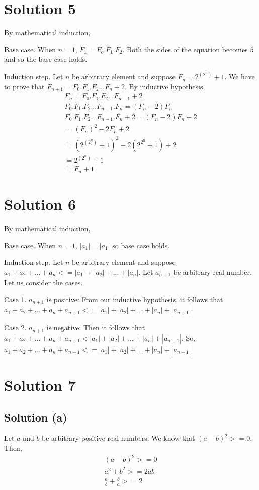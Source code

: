 \documentclass{article}
\begin{document}
\section{Solution 5}
By mathematical induction,

Base case. When $n=1$, $F_1 = F_o.F_1.F_2$. Both the sides of the
equation becomes $5$ and so the base case holds.

Induction step. Let $n$ be arbitrary element and suppose $F_n =
2^{(2^n)} + 1$. We have to prove that $F_{n+1} = F_0.F_1.F_2 ... F_n +
2$. By inductive hypothesis,
\begin{align*}
  F_n = F_0.F_1.F_2 ... F_{n-1} + 2 \\
  F_0.F_1.F_2 ... F_{n-1}.F_n = (F_n - 2)F_n \\
  F_0.F_1.F_2 ... F_{n-1}.F_n + 2 = (F_n - 2)F_n + 2 \\
  = (F_n)^2 - 2F_n + 2 \\
  = (2^{(2^n)} + 1)^2 - 2(2^{2^n} + 1) + 2 \\
  = 2^{(2^n)} + 1 \\
  = F_n + 1
\end{align*}

\section{Solution 6}
By mathematical induction,

Base case. When $n=1$, $|a_1| = |a_1|$ so base case holds.

Induction step. Let $n$ be arbitrary element and suppose $a_1 + a_2 +
... + a_n <= |a_1| + |a_2| + ... + |a_n|$. Let $a_{n+1}$ be arbitrary
real number. Let us consider the cases.

Case 1. $a_{n+1}$ is positive: From our inductive hypothesis, it
follows that $a_1 + a_2 + ... + a_n + a_{n+1} <= |a_1| + |a_2| + ... +
|a_n| + |a_{n+1}|$.

Case 2. $a_{n+1}$ is negative: Then it follows that
$a_1 + a_2 + ... + a_n + a_{n+1} < |a_1| + |a_2| + ... + |a_n| +
|a_{n+1}|$. So,
$a_1 + a_2 + ... + a_n + a_{n+1} <= |a_1| + |a_2| + ... + |a_n| +
|a_{n+1}|$.

\section{Solution 7}
\subsection{Solution (a)}
Let $a$ and $b$ be arbitrary positive real numbers. We know that
$(a-b)^2 >= 0$. Then,
\begin{align*}
  (a-b)^2 >= 0 \\
  a^2 + b^2 >= 2ab \\
  \frac{a}{b} + \frac{b}{a} >= 2
\end{align*}
\end{document}
